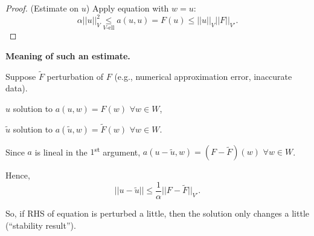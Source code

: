 \documentclass[12pt]{article}
\theoremstyle{definition}
\begin{document}
\begin{proof}
(Estimate on $u$) Apply equation with $w=u$:
\[\alpha||u||_V^2\underset{V\text{-ell}}{\leq}a(u,u)=F(u)\leq||u||_V||F||_{V'}.\]
\end{proof}

\textbf{Meaning of such an estimate.}

Suppose $\widetilde{F}$ perturbation of $F$ (e.g., numerical approximation error, inaccurate data).

$u$ solution to $a(u,w)=F(w)$ $\forall w\in W$,

$\tilde{u}$ solution to $a(\tilde{u},w)=\widetilde{F}(w)$ $\forall w\in W$.

Since $a$ is lineal in the $1$\textsuperscript{st} argument, $a(u-\tilde{u},w)=(F-\widetilde{F})(w)$ $\forall w\in W$.

Hence,
\[||u-\tilde{u}||\leq\frac{1}{\alpha}||F-\widetilde{F}||_{V'}.\]

So, if RHS of equation is perturbed a little, then the solution only changes a little (``stability result'').
\end{document}
